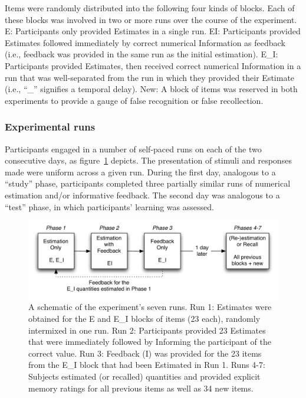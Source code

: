 Items were randomly distributed into the following four kinds of blocks. Each of
these blocks was involved in two or more runs over the course of the experiment.
E: Participants only provided Estimates in a single run. EI: Participants
provided Estimates followed immediately by correct numerical Information as
feedback (i.e., feedback was provided in the same run as the initial
estimation). E_I: Participants provided Estimates, then received correct
numerical Information in a run that was well-separated from the run in which
they provided their Estimate (i.e., ``_'' signifies a temporal delay). New: A
block of items was reserved in both experiments to provide a gauge of false
recognition or false recollection.

\subsubsection{Experimental runs}

Participants engaged in a number of self-paced runs on each of the two
consecutive days, as figure~\ref{ei-procedure} depicts. The presentation of
stimuli and responses made were uniform across a given run. During the first
day, analogous to a ``study'' phase, participants completed three partially
similar runs of numerical estimation and/or informative feedback. The second day
was analogous to a ``test'' phase, in which participants’ learning was assessed.

 
\begin{figure}[h]
\includegraphics[width=\textwidth]{Experiment1-procedure.pdf}
\caption{A schematic of the experiment's seven runs. Run 1:
Estimates were obtained for the E and E\_I blocks of items (23 each), randomly
intermixed in one run. Run 2: Participants provided 23 Estimates that were
immediately followed by Informing the participant of the correct value. Run 3:
Feedback (I) was provided for the 23 items from the E\_I block that had been
Estimated in Run 1. Runs 4-7: Subjects estimated (or recalled) quantities and
provided explicit memory ratings for all previous items as well as 34 new
items.}
\label{ei-procedure} 
\end{figure}

